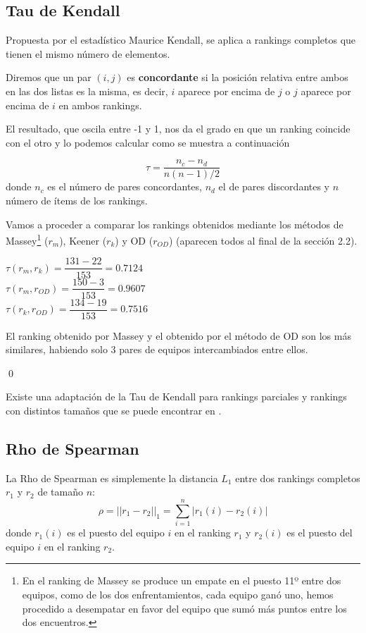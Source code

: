 \subsection{Tau de Kendall}
Propuesta por el estadístico Maurice Kendall, se aplica a rankings completos que tienen el mismo número de elementos. \\

\begin{defi} Diremos que un par $(i,j)$ es \textbf{concordante} si la posición relativa entre ambos en las dos listas es la misma, es decir, $i$ aparece por encima de $j$ o $j$ aparece por encima de $i$ en ambos rankings.
\end{defi}

El resultado, que oscila entre -1 y 1, nos da el grado en que un ranking coincide con el otro y lo podemos calcular como se muestra a continuación

\begin{equation}
\tau = \dfrac{n_{c} - n_{d}}{n(n-1)/2}
\end{equation}
donde $n_{c}$ es el número de pares concordantes, $n_{d}$ el de pares discordantes y $n$ número de ítems de los rankings. 

\begin{ejem} Vamos a proceder a comparar los rankings obtenidos mediante los métodos de Massey\footnote{En el ranking de Massey se produce un empate en el puesto 11º entre dos equipos, como de los dos enfrentamientos, cada equipo ganó uno, hemos procedido a desempatar en favor del equipo que sumó más puntos entre los dos encuentros.} ($r_{m}$), Keener ($r_{k}$) y OD ($r_{OD}$) (aparecen todos al final de la sección 2.2).
\end{ejem}
\begin{center}
$ \tau (r_{m},r_{k}) = \dfrac{131-22}{153} = 0.7124$\\
$ \tau (r_{m},r_{OD}) = \dfrac{150-3}{153} = 0.9607$\\
$ \tau (r_{k},r_{OD}) = \dfrac{134-19}{153} = 0.7516$
\end{center}
	
El ranking obtenido por Massey y el obtenido por el método de OD son los más similares, habiendo solo 3 pares de equipos intercambiados entre ellos.

\qed

Existe una adaptación de la Tau de Kendall para rankings parciales y rankings con distintos tamaños que se puede encontrar en \cite[pág 205,206]{cap16}.


\subsection{Rho de Spearman}
La Rho de Spearman es simplemente la distancia $L_{1}$ entre dos rankings completos $r_{1}$ y $r_{2}$ de tamaño $n$:
\begin{equation} \label{Spearman}
	\rho = ||r_{1} - r_{2}||_{1}= \sum_{i=1}^{n} |r_{1}(i) - r_{2}(i)|
\end{equation}
donde $r_{1}(i)$ es el puesto del equipo $i$ en el ranking $r_{1}$ y $r_{2}(i)$ es el puesto del equipo $i$ en el ranking $r_{2}$. \\

